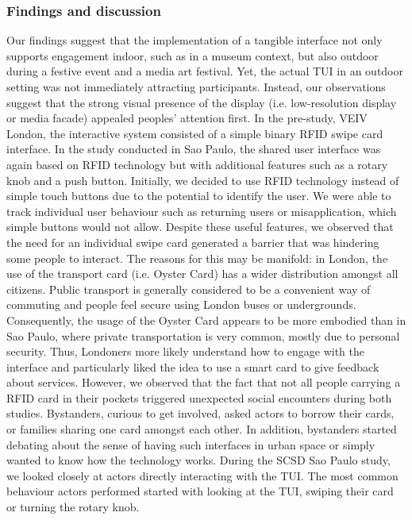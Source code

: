 \subsubsection{Findings and discussion}

Our findings suggest that the implementation of a tangible interface not only supports engagement indoor, such as in a museum context, but also outdoor during a festive event and a media art festival. 
Yet, the actual TUI in an outdoor setting was not immediately attracting participants. 
Instead, our observations suggest that the strong visual presence of the display (i.e. low-resolution display or media facade) appealed peoples’ attention first.
In the pre-study, VEIV London, the interactive system consisted of a simple binary RFID swipe card interface. In the study conducted in Sao Paulo, the shared user interface was again based on RFID technology but with additional features such as a rotary knob and a push button. 
Initially, we decided to use RFID technology instead of simple touch buttons due to the potential to identify the user.
We were able to track individual user behaviour such as returning users or misapplication, which simple buttons would not allow. 
Despite these useful features, we observed that the need for an individual swipe card generated a barrier that was hindering some people to interact. 
The reasons for this may be manifold: in London, the use of the transport card (i.e. Oyster Card) has a wider distribution amongst all citizens. 
Public transport is generally considered to be a convenient way of commuting and people feel secure using London buses or undergrounds.
Consequently, the usage of the Oyster Card appears to be more embodied than in Sao Paulo, where private transportation is very common, mostly due to personal security. 
Thus, Londoners more likely understand how to engage with the interface and particularly liked the idea to use a smart card to give feedback about services. 
However, we observed that the fact that not all people carrying a RFID card in their pockets triggered unexpected social encounters during both studies.
Bystanders, curious to get involved, asked actors to borrow their cards, or families sharing one card amongst each other. In addition, bystanders started debating about the sense of having such interfaces in urban space or simply wanted to know how the technology works.
During the SCSD Sao Paulo study, we looked closely at actors directly interacting with the TUI. 
The most common behaviour actors performed started with looking at the TUI, swiping their card or turning the rotary knob. 
